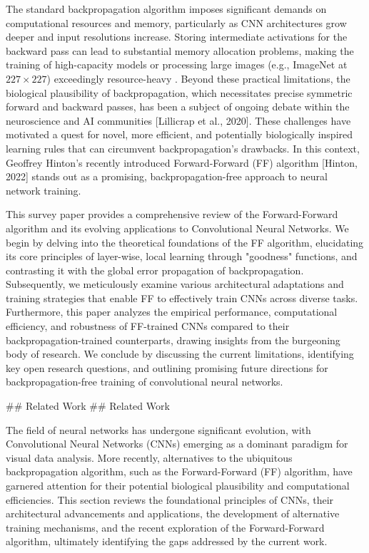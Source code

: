 \documentclass{article}
\begin{document}
The standard backpropagation algorithm imposes significant demands on computational resources and memory, particularly as CNN architectures grow deeper and input resolutions increase. Storing intermediate activations for the backward pass can lead to substantial memory allocation problems, making the training of high-capacity models or processing large images (e.g., ImageNet at $227 \times 227$) exceedingly resource-heavy \cite{10}. Beyond these practical limitations, the biological plausibility of backpropagation, which necessitates precise symmetric forward and backward passes, has been a subject of ongoing debate within the neuroscience and AI communities [Lillicrap et al., 2020]. These challenges have motivated a quest for novel, more efficient, and potentially biologically inspired learning rules that can circumvent backpropagation's drawbacks. In this context, Geoffrey Hinton's recently introduced Forward-Forward (FF) algorithm [Hinton, 2022] stands out as a promising, backpropagation-free approach to neural network training.

This survey paper provides a comprehensive review of the Forward-Forward algorithm and its evolving applications to Convolutional Neural Networks. We begin by delving into the theoretical foundations of the FF algorithm, elucidating its core principles of layer-wise, local learning through "goodness" functions, and contrasting it with the global error propagation of backpropagation. Subsequently, we meticulously examine various architectural adaptations and training strategies that enable FF to effectively train CNNs across diverse tasks. Furthermore, this paper analyzes the empirical performance, computational efficiency, and robustness of FF-trained CNNs compared to their backpropagation-trained counterparts, drawing insights from the burgeoning body of research. We conclude by discussing the current limitations, identifying key open research questions, and outlining promising future directions for backpropagation-free training of convolutional neural networks.

\#\# Related Work
\#\# Related Work

The field of neural networks has undergone significant evolution, with Convolutional Neural Networks (CNNs) emerging as a dominant paradigm for visual data analysis. More recently, alternatives to the ubiquitous backpropagation algorithm, such as the Forward-Forward (FF) algorithm, have garnered attention for their potential biological plausibility and computational efficiencies. This section reviews the foundational principles of CNNs, their architectural advancements and applications, the development of alternative training mechanisms, and the recent exploration of the Forward-Forward algorithm, ultimately identifying the gaps addressed by the current work.
\end{document}
